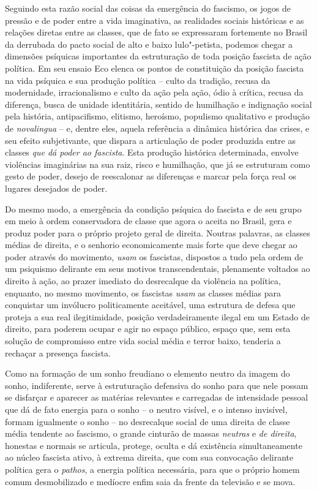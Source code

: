 Seguindo esta razão social das coisas da emergência do fascismo, os
jogos de pressão e de poder entre a vida imaginativa, as realidades
sociais históricas e as relações diretas entre as classes, que de fato
se expressaram fortemente no Brasil da derrubada do pacto social de alto
e baixo lulo"-petista, podemos chegar a dimensões psíquicas importantes
da estruturação de toda posição fascista de ação política. Em seu ensaio
Eco elenca os pontos de constituição da posição fascista na vida
psíquica e sua produção política -- culto da tradição, recusa da
modernidade, irracionalismo e culto da ação pela ação, ódio à crítica,
recusa da diferença, busca de unidade identitária, sentido de humilhação
e indignação social pela história, antipacifismo, elitismo, heroísmo,
populismo qualitativo e produção de \emph{novalingua} -- e, dentre eles,
aquela referência a dinâmica histórica das crises, e seu efeito
subjetivante, que dispara a articulação de poder produzida entre as
classes \emph{que dá poder ao fascista}. Esta produção histórica
determinada, envolve violências imaginárias na sua raiz, risco e
humilhação, que já se estruturam como gesto de poder, desejo de
reescalonar as diferenças e marcar pela força real os lugares desejados
de poder.

Do mesmo modo, a emergência da condição psíquica do fascista e de seu
grupo em meio à ordem conservadora de classe que agora o aceita no
Brasil, gera e produz poder para o próprio projeto geral de direita.
Noutras palavras, as classes médias de direita, e o senhorio
economicamente mais forte que deve chegar ao poder através do movimento,
\emph{usam} os fascistas, dispostos a tudo pela ordem de um psiquismo
delirante em seus motivos transcendentais, plenamente voltados ao
direito à ação, ao prazer imediato do desrecalque da violência na
política, enquanto, no mesmo movimento, os fascistas \emph{usam} as
classes médias para conquistar um invólucro politicamente aceitável, uma
estrutura de defesa que proteja a sua real ilegitimidade, posição
verdadeiramente ilegal em um Estado de direito, para poderem ocupar e
agir no espaço público, espaço que, sem esta solução de compromisso
entre vida social média e terror baixo, tenderia a rechaçar a presença
fascista.

Como na formação de um sonho freudiano o elemento neutro da imagem do
sonho, indiferente, serve à estruturação defensiva do sonho para que
nele possam se disfarçar e aparecer as matérias relevantes e carregadas
de intensidade pessoal que dá de fato energia para o sonho -- o neutro
visível, e o intenso invisível, formam igualmente o sonho -- no
desrecalque social de uma direita de classe média tendente ao fascismo,
o grande cinturão de massas \emph{neutras} e \emph{de direita}, honestas
e normais se articula, protege, oculta e dá existência simultaneamente
ao núcleo fascista ativo, à extrema direita, que com sua convocação
delirante política gera o \emph{pathos}, a energia política necessária,
para que o próprio homem comum desmobilizado e medíocre enfim saia da
frente da televisão e se mova.


